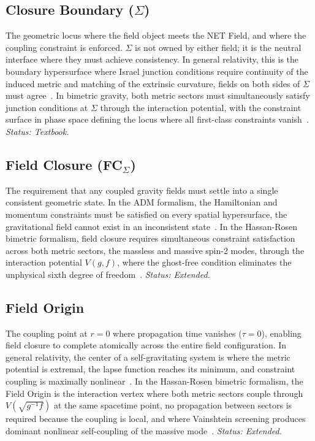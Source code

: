 \documentclass[aps,prd,preprint,superscriptaddress,showpacs,preprintnumbers,amsmath,amssymb,nofootinbib]{revtex4-2}
\begin{document}
\subsection*{Closure Boundary ($\Sigma$)}

The geometric locus where the field object meets the NET Field, and where the coupling constraint is enforced. $\Sigma$ is not owned by either field; it is the neutral interface where they must achieve consistency. In general relativity, this is the boundary hypersurface where Israel junction conditions require continuity of the induced metric and matching of the extrinsic curvature, fields on both sides of $\Sigma$ must agree~\cite{israel1966,mtw1973}. In bimetric gravity, both metric sectors must simultaneously satisfy junction conditions at $\Sigma$ through the interaction potential, with the constraint surface in phase space defining the locus where all first-class constraints vanish~\cite{hassan2012,dirac1964}. \emph{Status: Textbook.}

\subsection*{Field Closure (FC$_{\Sigma}$)}

The requirement that any coupled gravity fields must settle into a single consistent geometric state. In the ADM formalism, the Hamiltonian and momentum constraints must be satisfied on every spatial hypersurface, the gravitational field cannot exist in an inconsistent state~\cite{adm1962}. In the Hassan-Rosen bimetric formalism, field closure requires simultaneous constraint satisfaction across both metric sectors, the massless and massive spin-2 modes, through the interaction potential $V(g,f)$, where the ghost-free condition eliminates the unphysical sixth degree of freedom~\cite{hassan2012}. \emph{Status: Extended.}

\subsection*{Field Origin}

The coupling point at $r = 0$ where propagation time vanishes ($\tau = 0$), enabling field closure to complete atomically across the entire field configuration. In general relativity, the center of a self-gravitating system is where the metric potential is extremal, the lapse function reaches its minimum, and constraint coupling is maximally nonlinear~\cite{mtw1973}. In the Hassan-Rosen bimetric formalism, the Field Origin is the interaction vertex where both metric sectors couple through $V(\sqrt{g^{-1}f})$ at the same spacetime point, no propagation between sectors is required because the coupling is local, and where Vainshtein screening produces dominant nonlinear self-coupling of the massive mode~\cite{hassan2012,vainshtein1972}. \emph{Status: Extended.}
\end{document}

